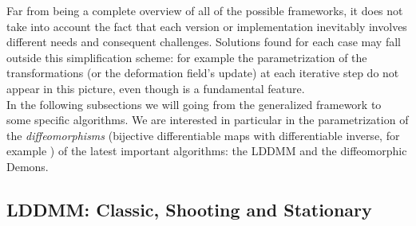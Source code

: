 \noindent
Far from being a complete overview of all of the possible frameworks, it does not take into account the fact that each version or implementation inevitably involves different needs and consequent challenges. Solutions found for each case may fall outside this simplification scheme: for example the parametrization of the transformations (or the deformation field's update) at each iterative step do not appear in this picture, even though is a fundamental feature. \\
In the following subsections we will going from the generalized framework to some specific algorithms. We are interested in particular in the parametrization of the \emph{diffeomorphisms} (bijective differentiable maps with differentiable inverse, for example \cite{lee2012introduction}) of the latest important algorithms: the LDDMM and the diffeomorphic Demons.

\subsection{LDDMM: Classic, Shooting and Stationary}\label{se:intro_lddmm}

